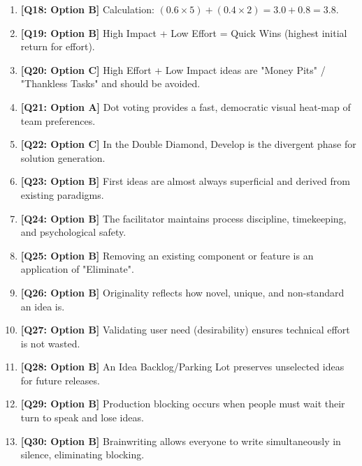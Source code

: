 \begin{expbox}
\begin{enumerate}[leftmargin=6mm, itemsep=2.5mm]
  \item \textbf{[Q18: Option B]} Calculation: $(0.6 \times 5) + (0.4 \times 2) = 3.0 + 0.8 = 3.8$.
  \item \textbf{[Q19: Option B]} High Impact + Low Effort = Quick Wins (highest initial return for effort).
  \item \textbf{[Q20: Option C]} High Effort + Low Impact ideas are "Money Pits" / "Thankless Tasks" and should be avoided.
  \item \textbf{[Q21: Option A]} Dot voting provides a fast, democratic visual heat-map of team preferences.
  \item \textbf{[Q22: Option C]} In the Double Diamond, Develop is the divergent phase for solution generation.
  \item \textbf{[Q23: Option B]} First ideas are almost always superficial and derived from existing paradigms.
  \item \textbf{[Q24: Option B]} The facilitator maintains process discipline, timekeeping, and psychological safety.
  \item \textbf{[Q25: Option B]} Removing an existing component or feature is an application of "Eliminate".
  \item \textbf{[Q26: Option B]} Originality reflects how novel, unique, and non-standard an idea is.
  \item \textbf{[Q27: Option B]} Validating user need (desirability) ensures technical effort is not wasted.
  \item \textbf{[Q28: Option B]} An Idea Backlog/Parking Lot preserves unselected ideas for future releases.
  \item \textbf{[Q29: Option B]} Production blocking occurs when people must wait their turn to speak and lose ideas.
  \item \textbf{[Q30: Option B]} Brainwriting allows everyone to write simultaneously in silence, eliminating blocking.
\end{enumerate}
\end{expbox}
